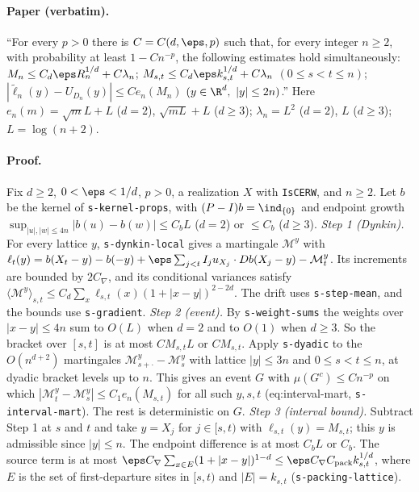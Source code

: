 \paragraph{Paper (verbatim).} ``For every $p>0$ there is $C=C(d,\eps,p)$ such that, for every integer
$n\geq2$, with probability at least $1-Cn^{-p}$, the following estimates hold simultaneously:
$M_n\leq C_d\eps R_n^{1/d}+C\lambda_n$; $M_{s,t}\leq C_d\eps k_{s,t}^{1/d}+C\lambda_n$ $(0\leq s<t\leq n)$;
$|\widetilde\ell_n(y)-U_{D_n}(y)|\leq C e_n(M_n)$ $(y\in\R^d,\ |y|\leq2n)$.''
Here $e_n(m)=\sqrt mL+L$ ($d=2$), $\sqrt{mL}+L$ ($d\ge3$); $\lambda_n=L^2$ ($d=2$), $L$ ($d\ge3$);
$L=\log(n+2)$.
\paragraph{Proof.} Fix $d\ge2$, $0<\eps<1/d$, $p>0$, a realization $X$ with \texttt{IsCERW}, and
$n\ge2$. Let $b$ be the kernel of \texttt{s-kernel-props}, with $(P-I)b=\ind_{\{0\}}$ and endpoint
growth $\sup_{|u|,|w|\le4n}|b(u)-b(w)|\le C_bL$ ($d=2$) or $\le C_b$ ($d\ge3$).
\emph{Step 1 (Dynkin).} For every lattice $y$, \texttt{s-dynkin-local} gives a martingale
$\mathcal M^y$ with
$\ell_t(y)=b(X_t-y)-b(-y)+\eps\sum_{j<t}I_ju_{X_j}\cdot Db(X_j-y)-\mathcal M^y_t$.
Its increments are bounded by $2C_\nabla$, and its conditional variances satisfy
$\langle\mathcal M^y\rangle_{s,t}\le C_d\sum_x\ell_{s,t}(x)(1+|x-y|)^{2-2d}$. The drift uses
\texttt{s-step-mean}, and the bounds use \texttt{s-gradient}.
\emph{Step 2 (event).} By \texttt{s-weight-sums} the weights over $|x-y|\le4n$ sum to $O(L)$ when
$d=2$ and to $O(1)$ when $d\ge3$. So the bracket over $[s,t]$ is at most $C M_{s,t}L$ or
$C M_{s,t}$. Apply \texttt{s-dyadic} to the $O(n^{d+2})$ martingales $\mathcal M^y_{s+\cdot}-\mathcal M^y_s$
with lattice $|y|\le3n$ and $0\le s<t\le n$, at dyadic bracket levels up to $n$. This gives an event
$G$ with $\mu(G^c)\le C n^{-p}$ on which $|\mathcal M^y_t-\mathcal M^y_s|\le C_1e_n(M_{s,t})$ for all
such $y,s,t$ (eq:interval-mart, \texttt{s-interval-mart}). The rest is deterministic on $G$.
\emph{Step 3 (interval bound).} Subtract Step 1 at $s$ and $t$ and take $y=X_j$ for $j\in[s,t)$ with
$\ell_{s,t}(y)=M_{s,t}$; this $y$ is admissible since $|y|\le n$. The endpoint difference is at most
$C_bL$ or $C_b$. The source term is at most
$\eps C_\nabla\sum_{x\in E}(1+|x-y|)^{1-d}\le\eps C_\nabla C_{\rm pack}k_{s,t}^{1/d}$, where $E$ is
the set of first-departure sites in $[s,t)$ and $|E|=k_{s,t}$ (\texttt{s-packing-lattice}).
